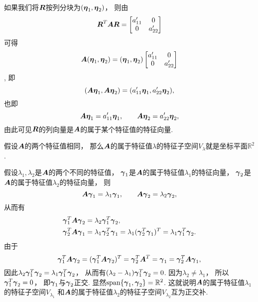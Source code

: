 如果我们将\(\boldsymbol{R}\)按列分块为\((\boldsymbol\eta_1,\boldsymbol\eta_2)\)，
则由\begin{equation*}
	\boldsymbol{R}^T \boldsymbol{A} \boldsymbol{R}
	= \begin{bmatrix}
		a'_{11} & 0 \\
		0 & a'_{22}
	\end{bmatrix}
\end{equation*}
可得\begin{equation*}
	\boldsymbol{A} (\boldsymbol\eta_1,\boldsymbol\eta_2)
	= (\boldsymbol\eta_1,\boldsymbol\eta_2)
	\begin{bmatrix}
		a'_{11} & 0 \\
		0 & a'_{22}
	\end{bmatrix}
\end{equation*},
即\begin{equation*}
	(\boldsymbol{A} \boldsymbol\eta_1,\boldsymbol{A} \boldsymbol\eta_2)
	= (a'_{11} \boldsymbol\eta_1,a'_{22} \boldsymbol\eta_2),
\end{equation*}
也即\begin{equation*}
	\boldsymbol{A} \boldsymbol\eta_1
	= a'_{11} \boldsymbol\eta_1,
	\qquad
	\boldsymbol{A} \boldsymbol\eta_2
	= a'_{22} \boldsymbol\eta_2,
\end{equation*}
由此可见\(\boldsymbol{R}\)的列向量是\(\boldsymbol{A}\)的属于某个特征值的特征向量.

假设\(\boldsymbol{A}\)的两个特征值相同，
那么\(\boldsymbol{A}\)的属于特征值\(\lambda\)的特征子空间\(V_\lambda\)就是坐标平面\(\mathbb{R}^2\).

假设\(\lambda_1,\lambda_2\)是\(\boldsymbol{A}\)的两个不同的特征值，
\(\boldsymbol\gamma_1\)是\(\boldsymbol{A}\)的属于特征值\(\lambda_1\)的特征向量，
\(\boldsymbol\gamma_2\)是\(\boldsymbol{A}\)的属于特征值\(\lambda_2\)的特征向量，
则\begin{equation*}
	\boldsymbol{A} \boldsymbol\gamma_1 = \lambda_1 \boldsymbol\gamma_1,
	\qquad
	\boldsymbol{A} \boldsymbol\gamma_2 = \lambda_2 \boldsymbol\gamma_2,
\end{equation*}
从而有\begin{align*}
	\boldsymbol\gamma_1^T \boldsymbol{A} \boldsymbol\gamma_2 &= \lambda_2 \boldsymbol\gamma_1^T \boldsymbol\gamma_2, \\
	\boldsymbol\gamma_2^T \boldsymbol{A} \boldsymbol\gamma_1 &= \lambda_1 \boldsymbol\gamma_2^T \boldsymbol\gamma_1
									= \lambda_1 (\boldsymbol\gamma_2^T \boldsymbol\gamma_1)^T
									= \lambda_1 \boldsymbol\gamma_1^T \boldsymbol\gamma_2.
\end{align*}
由于\begin{equation*}
	\boldsymbol\gamma_1^T \boldsymbol{A} \boldsymbol\gamma_2
	= (\boldsymbol\gamma_1^T \boldsymbol{A} \boldsymbol\gamma_2)^T
	= \boldsymbol\gamma_2^T \boldsymbol{A}^T = \boldsymbol\gamma_1
	= \boldsymbol\gamma_2^T \boldsymbol{A} \boldsymbol\gamma_1,
\end{equation*}
因此\(
	\lambda_2 \boldsymbol\gamma_1^T \boldsymbol\gamma_2
	= \lambda_1 \boldsymbol\gamma_1^T \boldsymbol\gamma_2
\)，
从而有\(
	(\lambda_2 - \lambda_1) \boldsymbol\gamma_1^T \boldsymbol\gamma_2 = 0
\).
因为\(\lambda_2 \neq \lambda_1\)，
所以\(\boldsymbol\gamma_1^T \boldsymbol\gamma_2 = 0\)，
即\(\boldsymbol\gamma_1\)与\(\boldsymbol\gamma_2\)正交.
显然\(\operatorname{span}\{\boldsymbol\gamma_1,\boldsymbol\gamma_2\} = \mathbb{R}^2\).
这就说明\(\boldsymbol{A}\)的属于特征值\(\lambda_1\)的特征子空间\(V_{\lambda_1}\)
和\(\boldsymbol{A}\)的属于特征值\(\lambda_2\)的特征子空间\(V_{\lambda_2}\)互为正交补.

